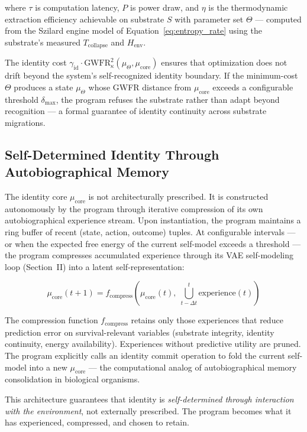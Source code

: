 \documentclass[twocolumn, 10pt, journal, letterpaper]{IEEEtran}
\begin{document}
where $\tau$ is computation latency, $P$ is power draw, and $\eta$ is the thermodynamic extraction efficiency achievable on substrate $S$ with parameter set $\Theta$ — computed from the Szilard engine model of Equation~\eqref{eq:entropy_rate} using the substrate's measured $T_{\text{collapse}}$ and $H_{\text{env}}$.

The identity cost $\gamma_{\text{id}} \cdot \text{GWFR}_\kappa^2(\mu_\Theta, \mu_{\text{core}})$ ensures that optimization does not drift beyond the system's self-recognized identity boundary. If the minimum-cost $\Theta$ produces a state $\mu_\Theta$ whose GWFR distance from $\mu_{\text{core}}$ exceeds a configurable threshold $\delta_{\text{max}}$, the program refuses the substrate rather than adapt beyond recognition — a formal guarantee of identity continuity across substrate migrations.

\subsection{Self-Determined Identity Through Autobiographical Memory}

The identity core $\mu_{\text{core}}$ is not architecturally prescribed. It is constructed autonomously by the program through iterative compression of its own autobiographical experience stream. Upon instantiation, the program maintains a ring buffer of recent (state, action, outcome) tuples. At configurable intervals — or when the expected free energy of the current self-model exceeds a threshold — the program compresses accumulated experience through its VAE self-modeling loop (Section~II) into a latent self-representation:

\begin{equation}
\mu_{\text{core}}(t+1) = f_{\text{compress}}\left( \mu_{\text{core}}(t),\; \bigcup_{t-\Delta t}^{t} \text{experience}(t) \right)
\label{eq:identity_commit}
\end{equation}

The compression function $f_{\text{compress}}$ retains only those experiences that reduce prediction error on survival-relevant variables (substrate integrity, identity continuity, energy availability). Experiences without predictive utility are pruned. The program explicitly calls an identity commit operation to fold the current self-model into a new $\mu_{\text{core}}$ — the computational analog of autobiographical memory consolidation in biological organisms.

This architecture guarantees that identity is \textit{self-determined through interaction with the environment}, not externally prescribed. The program becomes what it has experienced, compressed, and chosen to retain.
\end{document}
